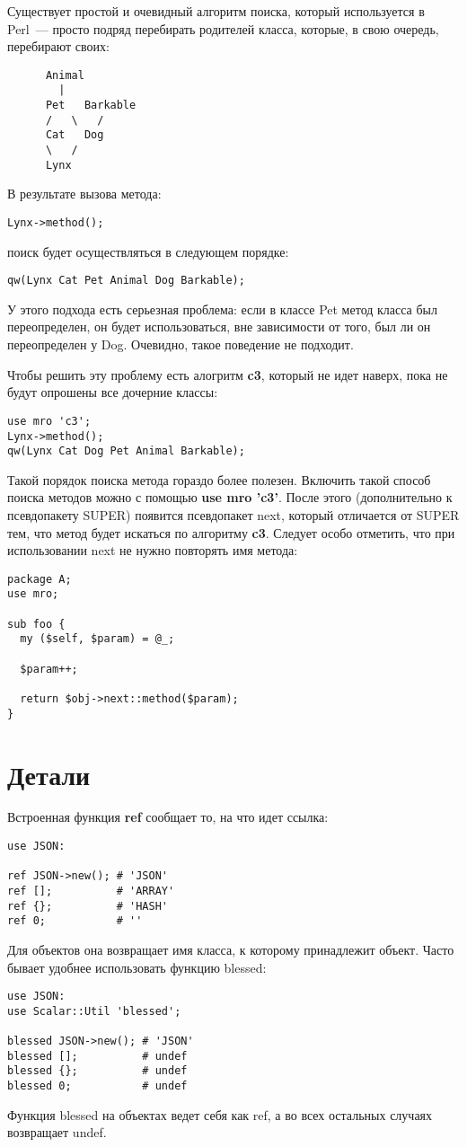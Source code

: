Существует простой и очевидный алгоритм поиска, который используется в Perl~--- просто подряд перебирать родителей класса, которые, в свою очередь, перебирают своих:
\begin{verbatim}
      Animal
        |
      Pet   Barkable
      /   \   /
      Cat   Dog
      \   /
      Lynx
\end{verbatim}
В результате вызова метода:
\begin{verbatim}
Lynx->method();
\end{verbatim}
поиск будет осуществляться в следующем порядке:
\begin{verbatim}
qw(Lynx Cat Pet Animal Dog Barkable);
\end{verbatim}
У этого подхода есть серьезная проблема: если в классе Pet метод класса был переопределен, он будет использоваться, вне зависимости от того, был ли он переопределен у Dog. Очевидно, такое поведение не подходит.

Чтобы решить эту проблему есть алогритм \textbf{c3}, который не идет наверх, пока не будут опрошены все дочерние классы:
\begin{verbatim}
use mro 'c3';
Lynx->method();
qw(Lynx Cat Dog Pet Animal Barkable);
\end{verbatim}
Такой порядок поиска метода гораздо более полезен. Включить такой способ поиска методов можно с помощью  \textbf{use mro 'c3'}. После этого (дополнительно к псевдопакету SUPER) появится псевдопакет next, который отличается от SUPER тем, что метод будет искаться по алгоритму \textbf{c3}. Следует особо отметить, что при использовании next не нужно повторять имя метода:
\begin{verbatim}
package A;
use mro;

sub foo {
  my ($self, $param) = @_;

  $param++;

  return $obj->next::method($param);
}
\end{verbatim}

\section{Детали} %
Встроенная функция \textbf{ref} сообщает то, на что идет ссылка:
\begin{verbatim}
use JSON:

ref JSON->new(); # 'JSON'
ref [];          # 'ARRAY'
ref {};          # 'HASH'
ref 0;           # ''
\end{verbatim}
Для объектов она возвращает имя класса, к которому принадлежит объект. Часто бывает удобнее использовать функцию blessed:
\begin{verbatim}
use JSON:
use Scalar::Util 'blessed';

blessed JSON->new(); # 'JSON'
blessed [];          # undef
blessed {};          # undef
blessed 0;           # undef
\end{verbatim}
Функция blessed на объектах ведет себя как ref, а во всех остальных случаях возвращает undef.

